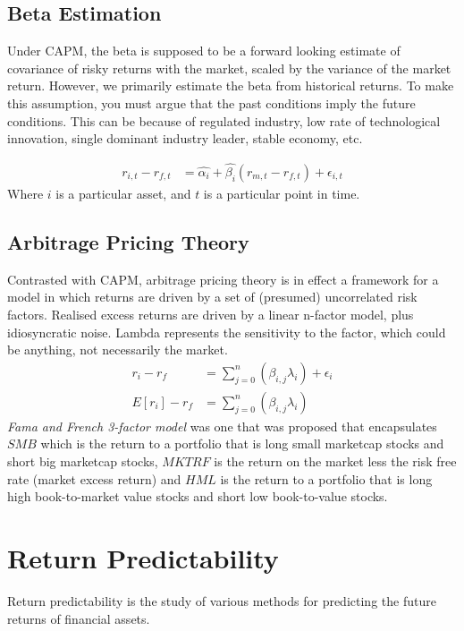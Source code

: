 \documentclass[a4paper]{article}
\begin{document}
\subsection{Beta Estimation}
Under CAPM, the beta is supposed to be a forward looking estimate of covariance of risky
returns with the market, scaled by the variance of the market return. However, we primarily
estimate the beta from historical returns. To make this assumption, you must argue that
the past conditions imply the future conditions. This can be because of regulated
industry, low rate of technological innovation, single dominant industry
leader, stable economy, etc.

\begin{align*}
r_{i,t} - r_{f,t} &= \widehat{\alpha_i} + \widehat{\beta_i}(r_{m,t} - r_{f,t}) + \epsilon_{i,t}
\end{align*}
Where $i$ is a particular asset, and $t$ is a particular point in time.

\subsection{Arbitrage Pricing Theory}
Contrasted with CAPM, arbitrage pricing theory is in effect a framework for a
model in which returns are driven by a set of (presumed) uncorrelated risk
factors. Realised excess returns are driven by a linear n-factor
model, plus idiosyncratic noise. Lambda represents the sensitivity
to the factor, which could be anything, not necessarily the market.
\begin{align*}
r_i - r_f &= \sum_{j=0}^{n} (\beta_{i,j} \lambda_i) + \epsilon_i \\
E[r_i] - r_f &= \sum_{j=0}^{n} (\beta_{i,j} \lambda_i)
\end{align*}
\emph{Fama and French 3-factor model} was one that was proposed that encapsulates
$SMB$ which is the return to a portfolio that is long small marketcap stocks
and short big marketcap stocks, $MKTRF$ is the return on the market less the risk
free rate (market excess return) and $HML$ is the return to a portfolio that
is long high book-to-market value stocks and short low book-to-value stocks.

\section{Return Predictability}
Return predictability is the study of various methods for predicting the future
returns of financial assets.
\end{document}
